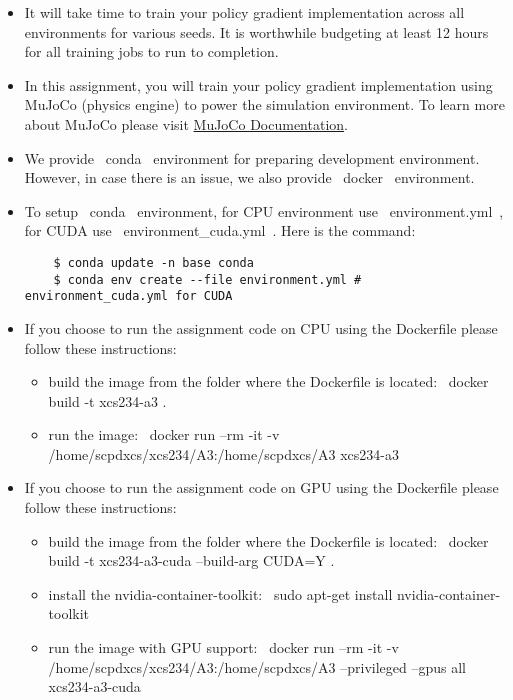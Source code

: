 \begin{itemize}
  \item It will take time to train your policy gradient implementation across all environments for various seeds. It is worthwhile budgeting at least 12 hours for all training jobs to run to completion.

  \item In this assignment, you will train your policy gradient implementation using MuJoCo (physics engine) to power the simulation environment. To learn more about MuJoCo please visit \href{https://mujoco.readthedocs.io/en/latest/overview.html}{MuJoCo Documentation}.

  \item We provide ~conda~ environment for preparing development environment. However, in case there is an issue, we also provide ~docker~ environment.

  \item To setup ~conda~ environment, for CPU environment use ~environment.yml~, for CUDA use ~environment_cuda.yml~. Here is the command:
    \begin{lstlisting}
    $ conda update -n base conda
    $ conda env create --file environment.yml #  environment_cuda.yml for CUDA
    \end{lstlisting}
  \item If you choose to run the assignment code on CPU using the Dockerfile please follow these instructions:
    \begin{itemize}
        \item build the image from the folder where the Dockerfile is located: ~docker build -t xcs234-a3 .~
        \item run the image:  ~docker run --rm -it -v /home/scpdxcs/xcs234/A3:/home/scpdxcs/A3 xcs234-a3~
    \end{itemize}

  \item If you choose to run the assignment code on GPU using the Dockerfile please follow these instructions:
    \begin{itemize}
        \item build the image from the folder where the Dockerfile is located: ~docker build -t xcs234-a3-cuda --build-arg CUDA=Y .~
        \item install the nvidia-container-toolkit: ~sudo apt-get install nvidia-container-toolkit~
        \item run the image with GPU support: ~docker run --rm -it -v /home/scpdxcs/xcs234/A3:/home/scpdxcs/A3 --privileged --gpus all xcs234-a3-cuda~
    \end{itemize}


\end{itemize}
